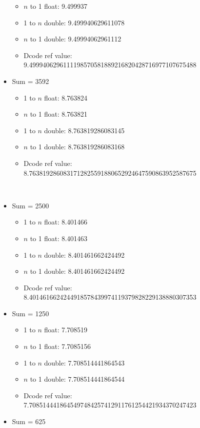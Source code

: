 \documentclass[12pt]{article}
\begin{document}
\begin{itemize}
\begin{itemize}
\item $n$ to 1 float: 9.499937
\\
\item 1 to $n$ double: 9.499940629611078
\item $n$ to 1 double: 9.49994062961112
\\
\item Dcode ref value: 9.4999406296111198570581889216820428716977107675488
\end{itemize}
\item Sum = 3592
\begin{itemize}
\item 1 to $n$ float: 8.763824
\item $n$ to 1 float: 8.763821
\\
\item 1 to $n$ double: 8.763819286083145
\item $n$ to 1 double: 8.763819286083168
\\
\item Dcode ref value: 8.7638192860831712825591880652924647590863952587675
\end{itemize}
\\
\item Sum = 2500
\begin{itemize}
\item 1 to $n$ float: 8.401466
\item $n$ to 1 float: 8.401463
\\
\item 1 to $n$ double: 8.401461662424492
\item $n$ to 1 double: 8.401461662424492
\\
\item Dcode ref value: 8.4014616624244918578439974119379828229138880307353
\end{itemize}
\break
\item Sum = 1250
\begin{itemize}
\item 1 to $n$ float: 7.708519
\item $n$ to 1 float: 7.7085156
\\
\item 1 to $n$ double: 7.708514441864543
\item $n$ to 1 double: 7.708514441864544
\\
\item Dcode ref value: 7.7085144418645497484257412911761254421934370247423
\\
\end{itemize}
\item Sum = 625

\end{itemize}
\end{document}
